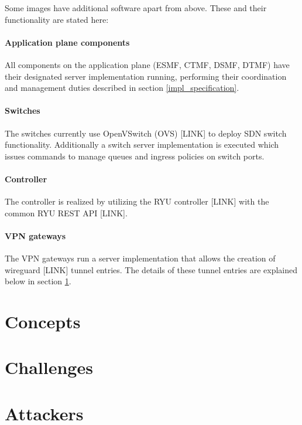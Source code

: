 Some images have additional software apart from above. These and their functionality are stated here:
\paragraph{Application plane components} All components on the application plane (ESMF, CTMF, DSMF, DTMF) have their designated server implementation running, performing their coordination and management duties described in section \ref{impl_specification}.
\paragraph{Switches} The switches currently use OpenVSwitch (OVS) [LINK] to deploy SDN switch functionality. Additionally a switch server implementation is executed which issues commands to manage queues and ingress policies on switch ports.
\paragraph{Controller} The controller is realized by utilizing the RYU controller [LINK] with the common RYU REST API [LINK].
\paragraph{VPN gateways} The VPN gateways run a server implementation that allows the creation of wireguard [LINK] tunnel entries. The details of these tunnel entries are explained below in section \ref{impl_concepts}.


\section{Concepts}
\label{impl_concepts}

\section{Challenges}

\section{Attackers}

